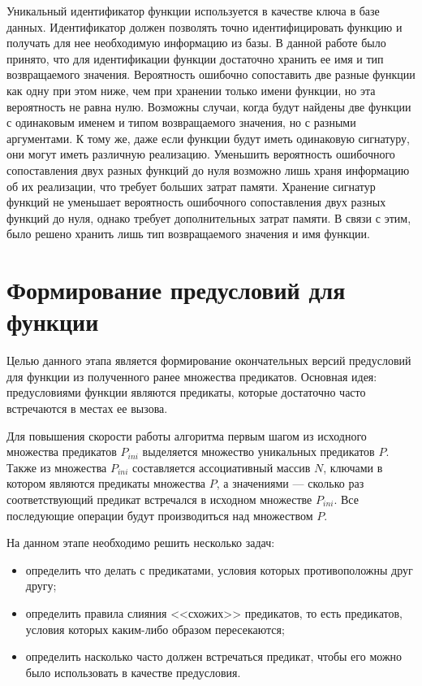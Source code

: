 Уникальный идентификатор функции используется в качестве ключа в базе данных. Идентификатор должен позволять точно идентифицировать функцию и получать для нее необходимую информацию из базы. В данной работе было принято, что для идентификации функции достаточно хранить ее имя и тип возвращаемого значения. Вероятность ошибочно сопоставить две разные функции как одну при этом ниже, чем при хранении только имени функции, но эта вероятность не равна нулю. Возможны случаи, когда будут найдены две функции с одинаковым именем и типом возвращаемого значения, но с разными аргументами. К тому же, даже если функции будут иметь одинаковую сигнатуру, они могут иметь различную реализацию. Уменьшить вероятность ошибочного сопоставления двух разных функций до нуля возможно лишь храня информацию об их реализации, что требует больших затрат памяти. Хранение сигнатур функций не уменьшает вероятность ошибочного сопоставления двух разных функций до нуля, однако требует дополнительных затрат памяти. В связи с этим, было решено хранить лишь тип возвращаемого значения и имя функции.

\section{Формирование предусловий для функции}
\label{section:merging}
Целью данного этапа является формирование окончательных версий предусловий для функции из полученного ранее множества предикатов. Основная идея: предусловиями функции являются предикаты, которые достаточно часто встречаются в местах ее вызова. 

Для повышения скорости работы алгоритма первым шагом из исходного множества предикатов $P_{ini}$ выделяется множество уникальных предикатов $P$. Также из множества $P_{ini}$ составляется ассоциативный массив $N$, ключами в котором являются предикаты множества $P$, а значениями --- сколько раз соответствующий предикат встречался в исходном множестве $P_{ini}$. Все последующие операции будут производиться над множеством $P$.

На данном этапе необходимо решить несколько задач:
\begin{itemize}
\item определить что делать с предикатами, условия которых противоположны друг другу;
\item определить правила слияния <<схожих>> предикатов, то есть предикатов, условия которых каким-либо образом пересекаются;
\item определить насколько часто должен встречаться предикат, чтобы его можно было использовать в качестве предусловия.
\end{itemize}

